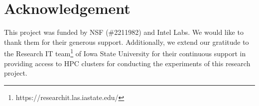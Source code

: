 \section{Acknowledgement}
This project was funded by NSF (\#2211982) and Intel Labs. We would like to thank them for their generous support. 
Additionally, we extend our gratitude to the Research IT team\footnote{https://researchit.las.iastate.edu/} of Iowa State University for their continuous support in providing access to HPC clusters for conducting the experiments of this research project.
